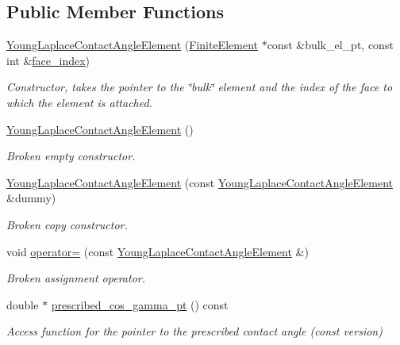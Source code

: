 \subsection*{Public Member Functions}
\begin{DoxyCompactItemize}
\item 
\hyperlink{classoomph_1_1YoungLaplaceContactAngleElement_a357c030b7a30cf89a670524e1def7d92}{Young\+Laplace\+Contact\+Angle\+Element} (\hyperlink{classoomph_1_1FiniteElement}{Finite\+Element} $\ast$const \&bulk\+\_\+el\+\_\+pt, const int \&\hyperlink{classoomph_1_1FaceElement_a478d577ac6db67ecc80f1f02ae3ab170}{face\+\_\+index})
\begin{DoxyCompactList}\small\item\em Constructor, takes the pointer to the \char`\"{}bulk\char`\"{} element and the index of the face to which the element is attached. \end{DoxyCompactList}\item 
\hyperlink{classoomph_1_1YoungLaplaceContactAngleElement_ac7fff7e187e14fed48b43c2b322b8b85}{Young\+Laplace\+Contact\+Angle\+Element} ()
\begin{DoxyCompactList}\small\item\em Broken empty constructor. \end{DoxyCompactList}\item 
\hyperlink{classoomph_1_1YoungLaplaceContactAngleElement_a47ffe6169393d1da5d5760209fab07db}{Young\+Laplace\+Contact\+Angle\+Element} (const \hyperlink{classoomph_1_1YoungLaplaceContactAngleElement}{Young\+Laplace\+Contact\+Angle\+Element} \&dummy)
\begin{DoxyCompactList}\small\item\em Broken copy constructor. \end{DoxyCompactList}\item 
void \hyperlink{classoomph_1_1YoungLaplaceContactAngleElement_a7c0ab1be7efdcb28da20c431aed61b4c}{operator=} (const \hyperlink{classoomph_1_1YoungLaplaceContactAngleElement}{Young\+Laplace\+Contact\+Angle\+Element} \&)
\begin{DoxyCompactList}\small\item\em Broken assignment operator. \end{DoxyCompactList}\item 
double $\ast$ \hyperlink{classoomph_1_1YoungLaplaceContactAngleElement_a75bfc79df63b02f0b445116482048250}{prescribed\+\_\+cos\+\_\+gamma\+\_\+pt} () const
\begin{DoxyCompactList}\small\item\em Access function for the pointer to the prescribed contact angle (const version) \end{DoxyCompactList}\item 

\end{DoxyCompactItemize}
